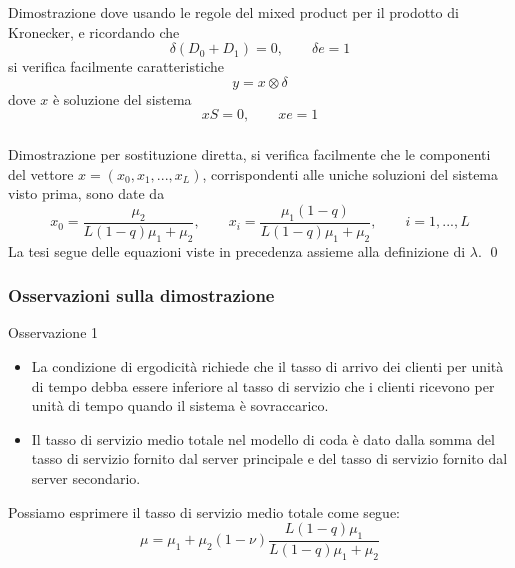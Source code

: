 \documentclass{beamer}
\begin{document}
\begin{frame}
    \frametitle{}
    \begin{block}{Dimostrazione}
            dove usando le regole del mixed product per il prodotto di Kronecker, e ricordando che
            $$ \delta(D_0 + D_1) = 0, \qquad \delta e = 1 $$
            si verifica facilmente caratteristiche
            $$ y = x \otimes \delta $$
            dove $x$ è soluzione del sistema
            $$xS = 0, \qquad xe = 1 $$
    \end{block}
\end{frame}


\begin{frame}
    \frametitle{}
    \begin{block}{Dimostrazione}
        per sostituzione diretta, si verifica facilmente che le componenti del vettore $x = (x_0, x_1, ... , x_L)$, corrispondenti alle uniche soluzioni del sistema visto prima, sono date da
        \begin{equation*}
            x_0 = \frac{\mu_2}{L(1-q)\mu_1 + \mu_2}, \qquad x_i = \frac{\mu_1(1-q)}{L(1-q)\mu_1 + \mu_2}, \qquad i = 1, ..., L
        \end{equation*}
        La tesi segue delle equazioni viste in precedenza assieme alla definizione di $\lambda$.
        \qed
    \end{block}
\end{frame}


\begin{frame}
    \frametitle{Osservazioni sulla dimostrazione}
    \begin{block}{Osservazione 1}
        \begin{itemize}
            \item La condizione di ergodicità richiede che il tasso di arrivo dei clienti per unità di tempo debba essere inferiore al tasso di servizio che i clienti ricevono per unità di tempo quando il sistema è sovraccarico.
            \item Il tasso di servizio medio totale nel modello di coda è dato dalla somma del tasso di servizio fornito dal server principale e del tasso di servizio fornito dal server secondario.
        \end{itemize}
        Possiamo esprimere il tasso di servizio medio totale come segue:
        $$\mu = \mu_1 + \mu_2(1 - \nu) \frac{L(1-q)\mu_1}{L(1-q)\mu_1 + \mu_2}$$
    \end{block}
\end{frame}
\end{document}
